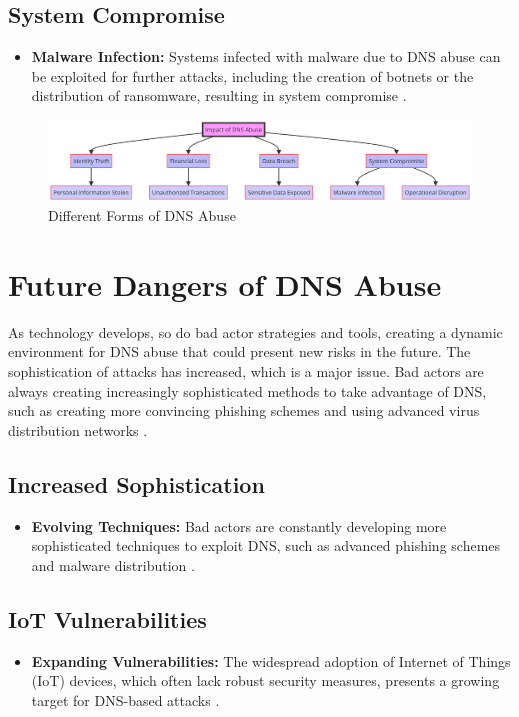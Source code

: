 \subsection{System Compromise}
\begin{itemize}
    \item \textbf{Malware Infection:} Systems infected with malware due to DNS abuse can be exploited for further attacks, including the creation of botnets or the distribution of ransomware, resulting in system compromise \cite{saxe2018malware}.
\end{itemize}
\captionsetup{font= footnotesize}
\begin{figure}[H]
\centering
\includegraphics[width=1.0\textwidth]{background/DNSabuseHarm.png}
\caption{Different Forms of DNS Abuse}
\label{fig:figureFour}
\end{figure}


\section{Future Dangers of DNS Abuse}

As technology develops, so do bad actor strategies and tools, creating a dynamic environment for DNS abuse that could present new risks in the future. The sophistication of attacks has increased, which is a major issue. Bad actors are always creating increasingly sophisticated methods to take advantage of DNS, such as creating more convincing phishing schemes and using advanced virus distribution networks \cite{icann2022dnsabusetrends}.

\subsection{Increased Sophistication}
\begin{itemize}
    \item \textbf{Evolving Techniques:} Bad actors are constantly developing more sophisticated techniques to exploit DNS, such as advanced phishing schemes and malware distribution \cite{wrightson2014advanced}.
\end{itemize}

\subsection{IoT Vulnerabilities}
\begin{itemize}
    \item \textbf{Expanding Vulnerabilities:} The widespread adoption of Internet of Things (IoT) devices, which often lack robust security measures, presents a growing target for DNS-based attacks \cite{mahmoud2015internet}.
\end{itemize}

